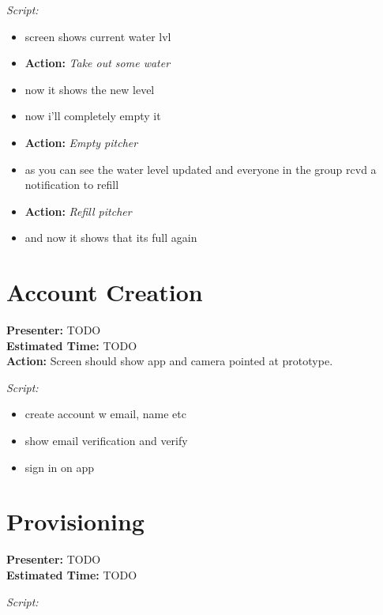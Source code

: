 \documentclass[12pt]{article}
\begin{document}
\bigskip
\noindent\textit{Script:}

\begin{itemize}[itemsep=-3pt]
\item screen shows current water lvl
\item \textbf{Action: }\textit{Take out some water}
\item now it shows the new level
\item now i'll completely empty it
\item \textbf{Action: }\textit{Empty pitcher}
\item as you can see the water level updated and everyone in the group rcvd a notification to refill
\item \textbf{Action: }\textit{Refill pitcher}
\item and now it shows that its full again
\end{itemize}


\section{Account Creation}
\noindent\textbf{Presenter:} TODO\\  
\noindent\textbf{Estimated Time:} TODO\\

\noindent\textbf{Action:} Screen should show app and camera pointed at prototype.

\bigskip
\noindent\textit{Script:}

\begin{itemize}[itemsep=-3pt]
\item create account w email, name etc
\item show email verification and verify
\item sign in on app
\end{itemize}


\section{Provisioning}
\noindent\textbf{Presenter:} TODO\\  
\noindent\textbf{Estimated Time:} TODO

\bigskip
\noindent\textit{Script:}
\end{document}
